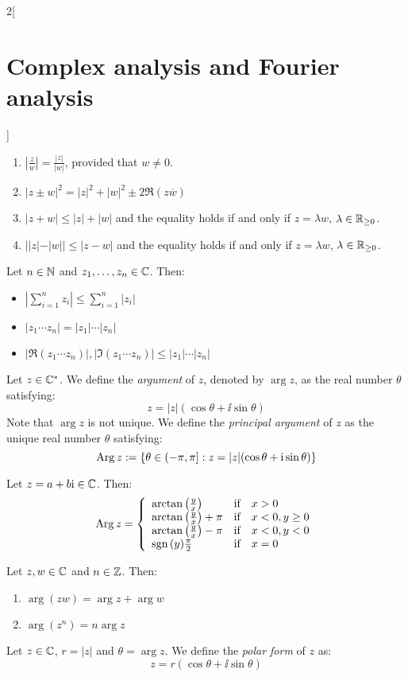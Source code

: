 \documentclass[../../../main.tex]{subfiles}
\begin{document}
\begin{multicols}{2}[\section{Complex analysis and Fourier analysis}]
\begin{prop}
\begin{enumerate}
      \item $\displaystyle\left|\frac{z}{w}\right|=\frac{|z|}{|w|}$, provided that $w\ne 0$.
      \item ${|z\pm w|}^2={|z|}^2+{|w|}^2\pm 2\Re(z\overline{w})$
      \item $|z+w|\leq |z|+ |w|$ and the equality holds if and only if $z=\lambda w$, $\lambda\in\mathbb{R}_{\geq 0}$.
      \item $||z|-|w||\leq |z-w|$ and the equality holds if and only if $z=\lambda w$, $\lambda\in\mathbb{R}_{\geq 0}$.
    \end{enumerate}
  \end{prop}
  \begin{corollary}
    Let $n\in\mathbb{N}$ and $z_1, \ldots, z_n \in \mathbb{C}$. Then:
    \begin{itemize}
      \item $\displaystyle \left| \sum_{i=1}^n{z_i} \right| \leq \sum_{i=1}^n{|z_i|}$
      \item $\displaystyle |z_1 \cdots z_n| = |z_1| \cdots |z_n|$
      \item $\displaystyle |\Re(z_1 \cdots z_n)|,|\Im(z_1 \cdots z_n)| \leq |z_1| \cdots |z_n|$
    \end{itemize}
  \end{corollary}
  \begin{definition}
    Let $z \in \mathbb{C}^*$. We define the \textit{argument} of $z$, denoted by $\arg{z}$, as the real number $\theta$ satisfying: $$z = |z|(\cos{\theta} + \ii\sin{\theta})$$ Note that $\arg{z}$ is not unique. We define the \textit{principal argument} of $z$ as the unique real number $\theta$ satisfying:
    $$\operatorname{Arg} z := \{\theta \in (-\pi, \pi]:z = |z|(\cos{\theta} + \mathrm{i}\sin{\theta})\}$$
  \end{definition}
  \begin{prop}
    Let $z=a+b\mathrm{i}\in\mathbb{C}$. Then:
    $$\operatorname{Arg} z=\left\{
      \begin{array}{lcl}
        \arctan\left(\frac{y}{x}\right)     & \text{if} & x>0         \\
        \arctan\left(\frac{y}{x}\right)+\pi & \text{if} & x<0,y\geq 0 \\
        \arctan\left(\frac{y}{x}\right)-\pi & \text{if} & x<0,y<0     \\
        \operatorname{sgn}{(y)}\frac{\pi}{2}             & \text{if} & x=0
      \end{array}
      \right.$$
  \end{prop}
  \begin{prop}
    Let $z, w \in \mathbb{C}$ and $n\in\mathbb{Z}$. Then:
    \begin{enumerate}
      \item $\arg{(zw)} = \arg z + \arg w$
      \item $\arg{(z^n)} = n \arg{z}$
    \end{enumerate}
  \end{prop}
  \begin{definition}
    Let $z\in\mathbb{C}$, $r=|z|$ and $\theta=\arg z$. We define the \emph{polar form} of $z$ as: $$z = r(\cos{\theta} + \ii\sin{\theta})$$
  \end{definition}

\end{multicols}
\end{document}
